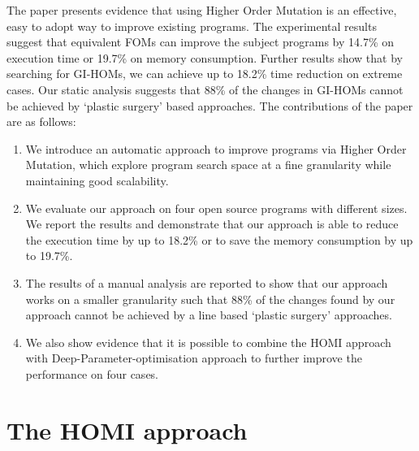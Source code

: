 \documentclass[oribibl]{llncs}
\begin{document}
The paper presents evidence that using Higher Order Mutation is an effective, easy to adopt way to improve existing programs. 
The experimental results suggest that equivalent FOMs can improve the subject programs by 14.7\% on execution time or 19.7\% on memory consumption.
Further results show that by searching for GI-HOMs, we can achieve up to 18.2\% time reduction on extreme cases.
Our static analysis suggests that 88\% of the changes in GI-HOMs cannot be achieved by `plastic surgery' based approaches.
The contributions of the paper are as follows:
\begin{enumerate}
\item We introduce an automatic approach to improve programs via Higher Order Mutation, which explore program search space at a fine granularity while maintaining good scalability.
\item We evaluate our approach on four open source programs with different sizes. We report the results and demonstrate that our approach is able to reduce the execution time by up to 18.2\% or to save the memory consumption by up to 19.7\%.
\item The results of a manual analysis are reported to show that our approach works on a smaller granularity such that 88\% of the changes found by our approach cannot be achieved by a line based `plastic surgery' approaches.
\item We also show evidence that it is possible to combine the HOMI approach with Deep-Parameter-optimisation approach to further improve the performance on four cases. 

\end{enumerate}




\section{The HOMI approach}
\label{sec_method}
\end{document}
